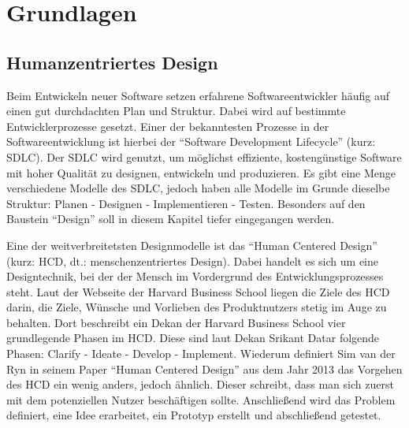 
\chapter{Grundlagen}
\label{chapter:3}


\section{Humanzentriertes Design}

Beim Entwickeln neuer Software setzen erfahrene Softwareentwickler häufig auf einen gut durchdachten Plan und Struktur. Dabei wird auf bestimmte Entwicklerprozesse gesetzt. Einer der bekanntesten Prozesse in der Softwareentwicklung ist hierbei der “Software Development Lifecycle” (kurz: SDLC). Der SDLC wird genutzt, um möglichst effiziente, kostengünstige Software mit hoher Qualität zu designen, entwickeln und produzieren.\cite{shylesh:2017} Es gibt eine Menge verschiedene Modelle des SDLC, jedoch haben alle Modelle im Grunde dieselbe Struktur: Planen - Designen - Implementieren - Testen. Besonders auf den Baustein “Design” soll in diesem Kapitel tiefer eingegangen werden.

Eine der weitverbreitetsten Designmodelle ist das “Human Centered Design” (kurz: HCD, dt.: menschenzentriertes Design).  Dabei handelt es sich um eine Designtechnik, bei der der Mensch im Vordergrund des Entwicklungsprozesses steht.\cite{hbsc:2020} Laut der Webseite der Harvard Business School liegen die Ziele des HCD darin, die Ziele, Wünsche und Vorlieben des Produktnutzers stetig im Auge zu behalten.\cite{hbsc:2020} Dort beschreibt ein Dekan der Harvard Business School vier grundlegende Phasen im HCD. Diese sind laut Dekan Srikant Datar folgende Phasen: Clarify - Ideate - Develop - Implement.\cite{hbsc:2020} Wiederum definiert Sim van der Ryn in seinem Paper “Human Centered Design” aus dem Jahr 2013 das Vorgehen des HCD ein wenig anders, jedoch ähnlich. Dieser schreibt, dass man sich zuerst mit dem potenziellen Nutzer beschäftigen sollte.\cite{vanderryn:2013} Anschließend wird das Problem definiert, eine Idee erarbeitet, ein Prototyp erstellt und abschließend getestet.\cite{vanderryn:2013}

